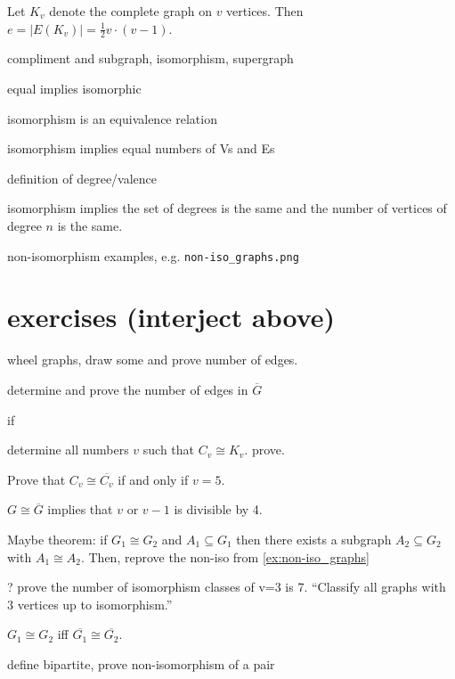 \begin{theorem} \label{thm:edges_in_Kv} Let $K_v$ denote the complete graph on $v$ vertices.  Then $e=|E(K_v)|= \frac{1}{2} v \cdot (v-1)$.
\end{theorem}

\begin{definition} compliment and subgraph, isomorphism, supergraph
\end{definition}

equal implies isomorphic

isomorphism is an equivalence relation

isomorphism implies equal numbers of Vs and Es

definition of degree/valence

isomorphism implies the set of degrees is the same and the number of vertices of degree $n$ is the same.

non-isomorphism examples, e.g. \verb|non-iso_graphs.png| \label{ex:non-iso_graphs}

\section*{exercises (interject above)}

wheel graphs, draw some and prove number of edges.

determine and prove the number of edges in $\overline{G}$

if

determine all numbers $v$ such that $C_v \cong K_v$. prove.

Prove that $C_v \cong \overline{C_v}$ if and only if $v = 5$.

$G \cong \overline{G}$ implies that $v$ or $v-1$ is divisible by 4.

Maybe theorem: if $G_1 \cong G_2$ and $A_1 \subseteq G_1$ then there exists a subgraph $A_2 \subseteq G_2$ with $A_1 \cong A_2$.  Then, reprove the non-iso from \ref{ex:non-iso_graphs}

? prove the number of isomorphism classes of v=3 is 7.  ``Classify all graphs with 3 vertices up to isomorphism.''

$G_1 \cong G_2$ iff $\overline{G_1} \cong \overline{G_2}$.

define bipartite, prove non-isomorphism of a pair
